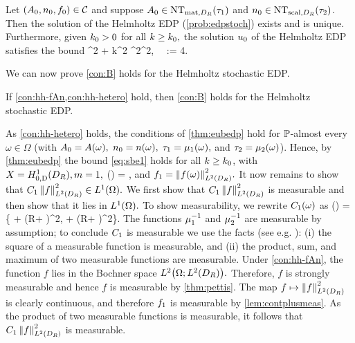 \noindent Let $(A_{0},n_{0},f_{0}) \in \mathcal C$ and suppose $\Az \in \NTA{\consto}$ and $\nz \in \NTn{\constt}$. Then the solution of the Helmholtz EDP (\cref{prob:edpstoch}) exists and is unique. Furthermore, given $k_{0} > 0$ for all $k \geq k_{0},$ the solution $u_{0}$ of the Helmholtz EDP satisfies the bound 
\beq\label{eq:heterobound1}
\consto \NLtDR{\grad \uz}^2 + \constt k^2 \NLtDR{\uz}^2\leq \Co \NLtDR{\fz}^2,\,\,  \,\, \Co := 4.
\eeq
\enth

We can now prove \cref{con:B} holds for the Helmholtz stochastic EDP.

\label{lem:hh-B}
If \cref{con:hh-fAn,con:hh-hetero} hold, then \cref{con:B} holds for the Helmholtz stochastic EDP.
\ele

As \cref{con:hh-hetero} holds,  the conditions of \cref{thm:eubedp} hold for $\mathbb P$-almost every $\omega \in \Omega$ (with $A_{0} = A(\omega),$ $n_{0} = n(\omega),$ $\tau_{1} = \mu_{1}(\omega),$ and $\tau_{2} = \mu_{2}(\omega)$). Hence, by \cref{thm:eubedp} the bound \eqref{eq:sbe1} holds for all $k \geq k_{0}$, with $X = \HozDDR, m=1,$
\beqs
\Co(\omega) = ,
\eeqs
and $\fo = \NLtDR{f(\omega)}^2.$ It now remains to show that $\Co\,\NLtDR{f}^2 \in \LoO.$ We first show that $\Co\,\NLtDR{f}^2$ is measurable and then show that it lies in $\LoO.$ To show measurability, we rewrite $C_{1}(\omega)$ as 
\beqs
\Co(\omega) =  \max\left\{ + \left(R+ \right)^2, + \left(R+ \right)^2\right\}.
\eeqs
The functions $\mu_{1}^{-1}$ and $\mu_{2}^{-1}$ are measurable by assumption; to conclude $C_{1}$ is measurable we use the facts (see e.g. \cite[Theorems 19.C, 20.A]{Ha:74}): (i) the square of a measurable function is measurable, and (ii) the product, sum, and maximum of two measurable functions are measurable. Under 
\cref{con:hh-fAn}, the function $f$ lies in the Bochner space $\LtOLtDR.$ Therefore, $f$ is strongly measurable and hence $f$ is measurable  by \cref{thm:pettis}. The map $f\mapsto\NLtDR{f}^2$ is clearly continuous, and therefore $f_{1}$ is measurable by \cref{lem:contplusmeas}. As the product of two measurable functions is measurable, it follows that $\Co\,\NLtDR{f}^2$ is measurable.

